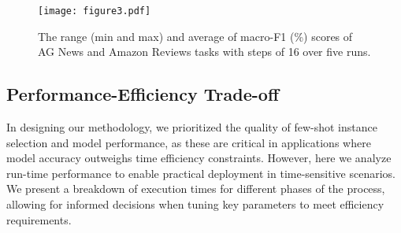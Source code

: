 \documentclass[11pt]{article}
\theoremstyle{definition}
\begin{document}
\begin{figure} [htb]
    \centering
	\texttt{[image: figure3.pdf]}
	\caption{The range (min and max) and average of macro-F1 (\%) scores of AG News and Amazon Reviews tasks with steps of 16 over five runs.}
	\label{fig:256graph}
\end{figure}


\subsection{Performance-Efficiency Trade-off}

In designing our methodology, we prioritized the quality of few-shot instance selection and model performance, as these are critical in applications where model accuracy outweighs time efficiency constraints. However, here we analyze run-time performance to enable practical deployment in time-sensitive scenarios. We present a breakdown of execution times for different phases of the process, allowing for informed decisions when tuning key parameters to meet efficiency requirements.

\begin{table}[hbt]
\centering
{}
\caption{Accumulated execution time (h:mm:ss) of embedding extraction, sampling, and fine-tuning across different models.}
\label{table:tradeoff}
\end{table}
\end{document}
